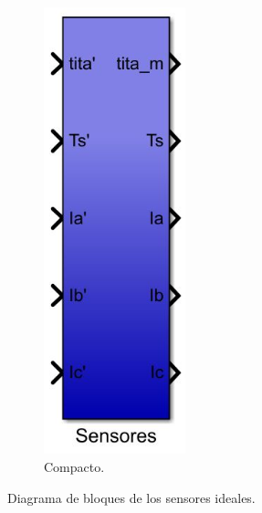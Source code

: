 \documentclass{article}
\begin{document}
\begin{enumerate}[label=\roman*.]
\begin{figure}[H]
\begin{subfigure}[b]{0.3\textwidth}
            \includegraphics[width=0.45\textwidth]{sensores_ideales_compacto.jpg}
            \caption{Compacto.}
        \end{subfigure}
        \caption{Diagrama de bloques de los sensores ideales.}
    \end{figure}


\end{enumerate}
\end{document}
